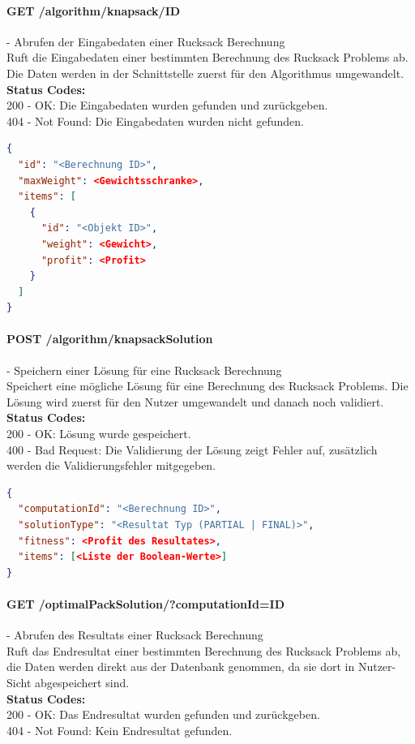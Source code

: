 \paragraph{GET /algorithm/knapsack/{ID}} - Abrufen der Eingabedaten einer Rucksack Berechnung\mbox{}\\
Ruft die Eingabedaten einer bestimmten Berechnung des Rucksack Problems ab. Die Daten werden in der Schnittstelle zuerst für den Algorithmus umgewandelt.\\
\textbf{Status Codes:}\\
200 - OK: Die Eingabedaten wurden gefunden und zurückgeben.\\
404 - Not Found: Die Eingabedaten wurden nicht gefunden.\\

\begin{lstlisting}[language=JSON, caption=Beispiel für Eingabedaten des Rucksack Problems für den Algorithmus, label=lst:input_knapsack_algo]  
{
  "id": "<Berechnung ID>",
  "maxWeight": <Gewichtsschranke>,
  "items": [
    {
      "id": "<Objekt ID>",
      "weight": <Gewicht>,
      "profit": <Profit>
    }
  ]
}
\end{lstlisting}

\paragraph{POST /algorithm/knapsackSolution} - Speichern einer Lösung für eine Rucksack Berechnung\mbox{}\\
Speichert eine mögliche Lösung für eine Berechnung des Rucksack Problems. Die Lösung wird zuerst für den Nutzer umgewandelt und danach noch validiert.\\
\textbf{Status Codes:}\\
200 - OK: Lösung wurde gespeichert.\\
400 - Bad Request: Die Validierung der Lösung zeigt Fehler auf, zusätzlich werden die Validierungsfehler mitgegeben.\\

\begin{lstlisting}[language=JSON, caption=Beispiel eines Resultates für das Rucksack Problem aus Algorithmus-Sicht, label=lst:solution_knapsack_algo]  
{
  "computationId": "<Berechnung ID>",
  "solutionType": "<Resultat Typ (PARTIAL | FINAL)>",
  "fitness": <Profit des Resultates>,
  "items": [<Liste der Boolean-Werte>]
}
\end{lstlisting}

\paragraph{GET /optimalPackSolution/?computationId={ID}} - Abrufen des Resultats einer Rucksack Berechnung\mbox{}\\
Ruft das Endresultat einer bestimmten Berechnung des Rucksack Problems ab, die Daten werden direkt aus der Datenbank genommen, da sie dort in Nutzer-Sicht abgespeichert sind.\\
\textbf{Status Codes:}\\
200 - OK: Das Endresultat wurden gefunden und zurückgeben.\\
404 - Not Found: Kein Endresultat gefunden.\\

